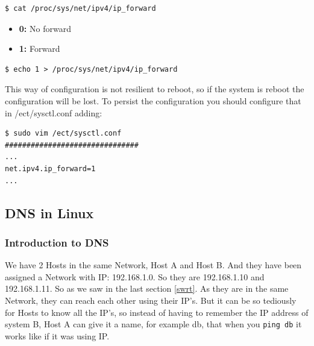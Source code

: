 \documentclass{article}
\newenvironment{blocktemplateIII}[1]{%
    \tcolorbox[beamer,%
    noparskip,breakable,
    ,colframe=Red,%
    colbacklower=LimeGreen!75!LightGreen,%
    title=#1]}%
    {\endtcolorbox}
\newenvironment{codetemplate}[1][]{%
  \mybasecolorbox[#1]
  \itshape
}{%
  \endmybasecolorbox
}
\begin{document}
\begin{codetemplate}{}
\begin{verbatim}
$ cat /proc/sys/net/ipv4/ip_forward
\end{verbatim}
\end{codetemplate}

\begin{itemize}
    \item \textbf{0:} No forward
    \item \textbf{1:} Forward
\end{itemize}


\begin{codetemplate}{}
\begin{verbatim}
$ echo 1 > /proc/sys/net/ipv4/ip_forward
\end{verbatim}
\end{codetemplate}

\begin{blocktemplateIII}{WARNING}
This way of configuration is not resilient to reboot, so if the system is reboot the configuration will be lost. To persist the configuration you should configure that in /ect/sysctl.conf adding:
\begin{codetemplate}{}
\begin{verbatim}
$ sudo vim /ect/sysctl.conf
###############################
...
net.ipv4.ip_forward=1
...
\end{verbatim}
\end{codetemplate}

\end{blocktemplateIII}

\subsection{DNS in Linux}

\subsubsection{Introduction to DNS}

We have 2 Hosts in the same Network, Host A and Host B. And they have been assigned a Network with IP: 192.168.1.0. So they are 192.168.1.10 and 192.168.1.11. So as we saw in the last section \ref{swrt}. As they are in the same Network, they can reach each other using their IP's. But it can be so tediously for Hosts to know all the IP's, so instead of having to remember the IP address of system B, Host A can give it a name, for example db, that when you \verb|ping db| it works like if it was using IP.
\end{document}
